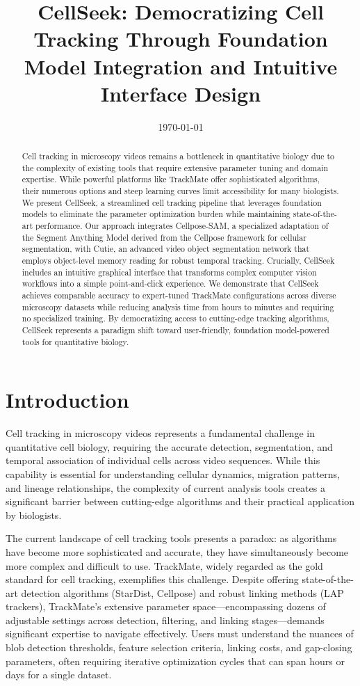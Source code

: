 \documentclass[12pt]{article}
\title{CellSeek: Democratizing Cell Tracking Through Foundation Model Integration and Intuitive Interface Design}
\date{\today}
\begin{document}
\maketitle

\begin{abstract}
  Cell tracking in microscopy videos remains a bottleneck in quantitative biology due to the complexity of existing tools that require extensive parameter tuning and domain expertise. While powerful platforms like TrackMate offer sophisticated algorithms, their numerous options and steep learning curves limit accessibility for many biologists. We present CellSeek, a streamlined cell tracking pipeline that leverages foundation models to eliminate the parameter optimization burden while maintaining state-of-the-art performance. Our approach integrates Cellpose-SAM, a specialized adaptation of the Segment Anything Model derived from the Cellpose framework for cellular segmentation, with Cutie, an advanced video object segmentation network that employs object-level memory reading for robust temporal tracking. Crucially, CellSeek includes an intuitive graphical interface that transforms complex computer vision workflows into a simple point-and-click experience. We demonstrate that CellSeek achieves comparable accuracy to expert-tuned TrackMate configurations across diverse microscopy datasets while reducing analysis time from hours to minutes and requiring no specialized training. By democratizing access to cutting-edge tracking algorithms, CellSeek represents a paradigm shift toward user-friendly, foundation model-powered tools for quantitative biology.
\end{abstract}

\section{Introduction}

Cell tracking in microscopy videos represents a fundamental challenge in quantitative cell biology, requiring the accurate detection, segmentation, and temporal association of individual cells across video sequences. While this capability is essential for understanding cellular dynamics, migration patterns, and lineage relationships, the complexity of current analysis tools creates a significant barrier between cutting-edge algorithms and their practical application by biologists.

The current landscape of cell tracking tools presents a paradox: as algorithms have become more sophisticated and accurate, they have simultaneously become more complex and difficult to use. TrackMate, widely regarded as the gold standard for cell tracking, exemplifies this challenge. Despite offering state-of-the-art detection algorithms (StarDist, Cellpose) and robust linking methods (LAP trackers), TrackMate's extensive parameter space—encompassing dozens of adjustable settings across detection, filtering, and linking stages—demands significant expertise to navigate effectively. Users must understand the nuances of blob detection thresholds, feature selection criteria, linking costs, and gap-closing parameters, often requiring iterative optimization cycles that can span hours or days for a single dataset.
\end{document}
